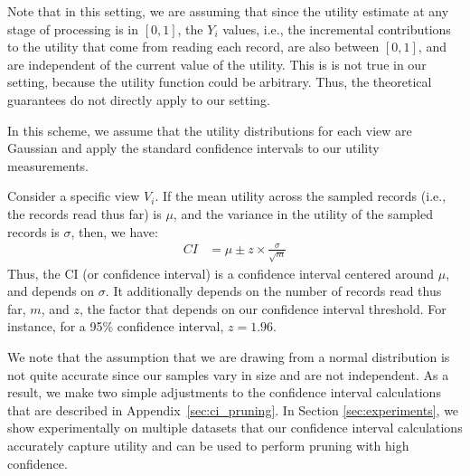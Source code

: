 Note that in this setting, we are assuming that since the
utility estimate at any stage of processing is in $[0, 1]$, 
the $Y_i$ values, i.e., the incremental contributions to the utility
that come from reading each record, are also between $[0, 1]$,
and are independent of the current value of the utility. 
This is is not true in our setting, 
because the utility function could be arbitrary.
Thus, the theoretical guarantees do not directly apply to our setting. 

 In this scheme, we assume that the utility
distributions for each view are Gaussian and apply the standard confidence
intervals to our utility measurements.

Consider a specific view $V_i$. 
If the mean utility across the sampled records 
(i.e., the records read thus far) is $\mu$,
and the variance in the utility of the sampled records
is $\sigma$, then, we have:
\begin{align}
CI & = \mu \pm z \times \frac{\sigma}{\sqrt{m}}
\end{align}
Thus, the CI (or confidence interval) is 
a confidence interval centered around $\mu$, 
and depends on $\sigma$. 
It additionally depends on the number of records
read thus far, $m$,
and $z$, the factor that depends on our confidence interval threshold.
For instance, for a 95\% confidence interval, $z = 1.96$.

We note that the assumption that we are drawing from a normal distribution is
not quite accurate since our samples vary in size and are not independent.
As a result, we make two simple adjustments to the confidence interval
calculations that are described in Appendix~\ref{sec:ci_pruning}.
In Section \ref{sec:experiments}, we show experimentally on multiple datasets
that our confidence interval calculations accurately capture utility and can be used to
perform pruning with high confidence.







